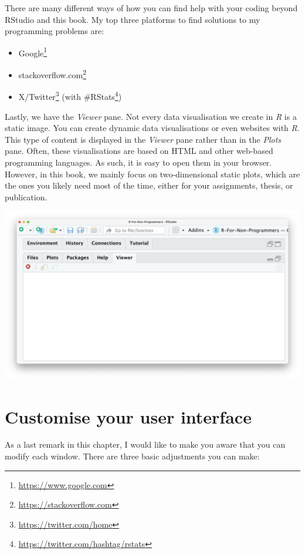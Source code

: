 \documentclass[
  letterpaper,
]{krantz}
\renewcommand{\href}[2]{#2\footnote{\url{#1}}}
\begin{document}
There are many different ways of how you can find help with your coding
beyond RStudio and this book. My top three platforms to find solutions
to my programming problems are:

\begin{itemize}
\item
  \href{https://www.google.com}{Google}
\item
  \href{https://stackoverflow.com}{stackoverflow.com}
\item
  \href{https://twitter.com/home}{X/Twitter} (with
  \href{https://twitter.com/hashtag/rstats}{\#RStats})
\end{itemize}

Lastly, we have the \emph{Viewer} pane. Not every data visualisation we
create in \emph{R} is a static image. You can create dynamic data
visualisations or even websites with \emph{R}. This type of content is
displayed in the \emph{Viewer} pane rather than in the \emph{Plots}
pane. Often, these visualisations are based on HTML and other web-based
programming languages. As such, it is easy to open them in your browser.
However, in this book, we mainly focus on two-dimensional static plots,
which are the ones you likely need most of the time, either for your
assignments, thesis, or publication.

\includegraphics{images/chapter_04_img/05_files_plots_etc/05_rstudio_viewer.png}

\section{Customise your user
interface}\label{sec-customise-your-user-interface}

As a last remark in this chapter, I would like to make you aware that
you can modify each window. There are three basic adjustments you can
make:
\end{document}
